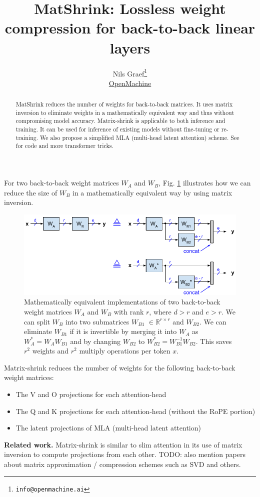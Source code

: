 \documentclass{article}
\title{MatShrink: Lossless weight compression for back-to-back linear layers}
\author{Nils Graef\thanks{\texttt{info@openmachine.ai}} \\
  \href{https://openmachine.ai}{OpenMachine}}
\newcommand{\eR}[2]{$\in \mathbb{R}^{#1 \times #2}$}  %
\begin{document}
 \maketitle

\begin{abstract}
MatShrink reduces the number of weights for back-to-back matrices. It uses matrix inversion to eliminate weights in a mathematically equivalent way and thus without compromising model accuracy. Matrix-shrink is applicable to both inference and training. It can be used for inference of existing models without fine-tuning or re-training. We also propose a simplified MLA (multi-head latent attention) scheme. See \citep{tricks} for code and more transformer tricks.
\end{abstract}

For two back-to-back weight matrices $W_A$ and $W_B$, Fig. \ref{fig1} illustrates how we can reduce the size of $W_B$ in a mathematically equivalent way by using matrix inversion.
\begin{figure}[h!] \centering  %
  \includegraphics[scale=0.88]{../doc/fig/matShrink_fig1.pdf}
  \caption{Mathematically equivalent implementations of two back-to-back weight matrices $W_A$ and $W_B$ with rank $r$, where $d > r$ and $e > r$. We can split $W_B$ into two submatrices $W_{B1}$ \eR{r}{r} and $W_{B2}$. We can eliminate $W_{B1}$ if it is invertible by merging it into $W_A$ as $W_A^\ast = W_A W_{B1}$ and by changing $W_{B2}$ to $W_{B2}^\ast = W_{B1}^{-1} W_{B2}$. This saves $r^2$ weights and $r^2$ multiply operations per token $x$.}
\label{fig1} \end{figure}

Matrix-shrink reduces the number of weights for the following back-to-back weight matrices:

\begin{itemize}[topsep=-1pt, itemsep=-1pt]
  \item The V and O projections for each attention-head
  \item The Q and K projections for each attention-head (without the RoPE portion)
  \item The latent projections of MLA (multi-head latent attention)
\end{itemize}
\textbf{Related work.} Matrix-shrink is similar to slim attention \citep{slimAttn} in its use of matrix inversion to compute projections from each other. TODO: also mention papers about matrix approximation / compression schemes such as SVD and others.
\end{document}
